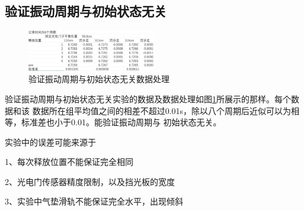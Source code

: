 \documentclass{ctexart}
\begin{document}
  \subsection{验证振动周期与初始状态无关}
  \begin{figure}[t]
    \centering
    \includegraphics[height=0.3\textwidth,width=0.5\textwidth]{yanzhengwuguanshujv.png}
    \caption{验证振动周期与初始状态无关数据处理}\label{yanzhengwuguanshujv}
  \end{figure}
  验证振动周期与初始状态无关实验的数据及数据处理如图\ref{yanzhengwuguanshujv}所展示的那样。每个数据和该
  数据所在组平均值之间的相差不超过0.01s，除以八个周期后近似可以为相等，标准差也小于0.01。能验证振动周期与
  初始状态无关。

  实验中的误差可能来源于
  
  1、每次释放位置不能保证完全相同

  2、光电门传感器精度限制，以及挡光板的宽度

  3、实验中气垫滑轨不能保证完全水平，出现倾斜
\end{document}
